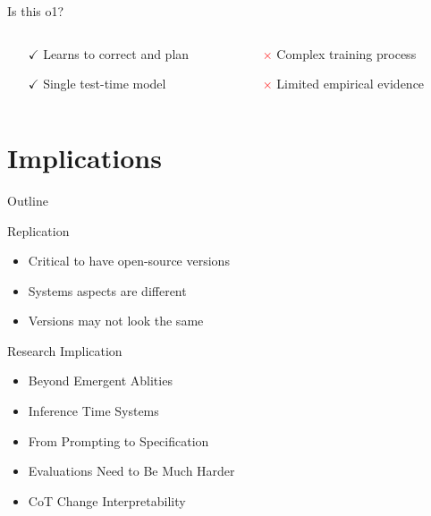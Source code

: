 \documentclass[14pt,aspectratio=169]{beamer}
\begin{document}
\begin{frame}{Is this o1?}
	\begin{columns}
		\begin{column}{0.5\linewidth}
			\begin{itemize}
				\item[$\boldsymbol{\checkmark}$] Learns to correct and plan
				\item[$\boldsymbol{\checkmark}$] Single test-time model
			\end{itemize}
		\end{column}
		\begin{column}{0.5\linewidth}
			\begin{itemize}
				\item[\textcolor{red}{$\boldsymbol{\times}$}] Complex training process
				\item[\textcolor{red}{$\boldsymbol{\times}$}] Limited empirical evidence
			\end{itemize}
		\end{column}
	\end{columns}
\end{frame}

\section{Implications}

\begin{frame}{Outline}
\end{frame}

\begin{frame}{Replication}
	\begin{itemize}
		\item Critical to have open-source versions
		\item Systems aspects are different
		\item Versions may not look the same
	\end{itemize}

\end{frame}


\begin{frame}{Research Implication}
	\begin{itemize}
		\item Beyond Emergent Ablities
		      \pause
		\item Inference Time Systems
		      \pause
		\item From Prompting to Specification
		      \pause
		\item Evaluations Need to Be Much Harder
		      \pause
		\item CoT Change Interpretability
	\end{itemize}
\end{frame}
\end{document}
